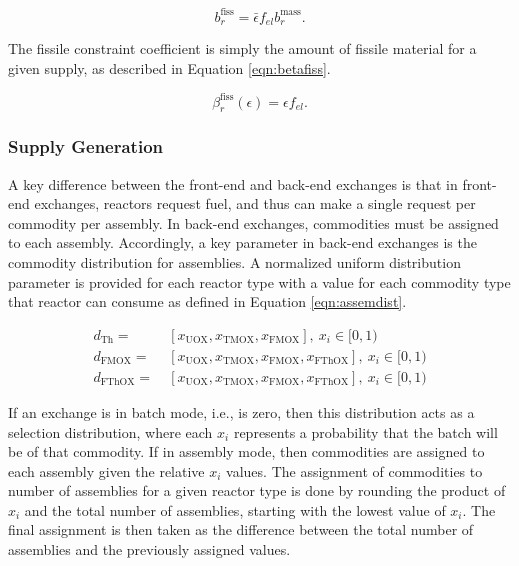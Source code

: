 \begin{equation}\label{eqn:bfiss}
b^{\text{fiss}}_r = \bar{\epsilon} f_{el} b^{\text{mass}}_r.
\end{equation}

\noindent
The fissile constraint coefficient is simply the amount of fissile material for
a given supply, as described in Equation \ref{eqn:betafiss}.

\begin{equation}\label{eqn:betafiss}
\beta^{\text{fiss}}_r(\epsilon) = \epsilon f_{el}.
\end{equation}

\subsubsection{Supply Generation}

A key difference between the front-end and back-end exchanges is that in
front-end exchanges, reactors request fuel, and thus can make a single request
per commodity per assembly. In back-end exchanges, commodities must be assigned
to each assembly. Accordingly, a key parameter in back-end exchanges is the
commodity distribution for assemblies. A normalized uniform distribution
parameter is provided for each reactor type with a value for each commodity type
that reactor can consume as defined in Equation \ref{eqn:assemdist}.

\begin{equation}\label{eqn:assemdist}
\begin{split}
d_{\text{Th}} = & \:
[x_{\text{UOX}}, x_{\text{TMOX}}, x_{\text{FMOX}}], \: x_i \in [0, 1) \\
d_{\text{FMOX}} = & \:
[x_{\text{UOX}}, x_{\text{TMOX}}, x_{\text{FMOX}}, x_{\text{FThOX}}], \: x_i \in [0, 1) \\
d_{\text{FThOX}} = & \:
[x_{\text{UOX}}, x_{\text{TMOX}}, x_{\text{FMOX}}, x_{\text{FThOX}}], \: x_i \in [0, 1) 
\end{split}
\end{equation}

If an exchange is in batch mode, i.e., \frx is zero, then this distribution
acts as a selection distribution, where each $x_i$ represents a probability that
the batch will be of that commodity. If in assembly mode, then commodities are
assigned to each assembly given the relative $x_i$ values.  The assignment of
commodities to number of assemblies for a given reactor type is done by rounding
the product of $x_i$ and the total number of assemblies, starting with the
lowest value of $x_i$. The final assignment is then taken as the difference
between the total number of assemblies and the previously assigned values.

